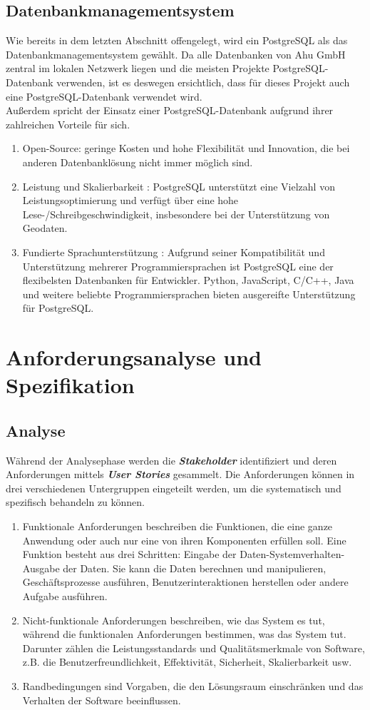 \documentclass[a4paper,12pt]{scrreprt}
\begin{document}
	\section{Datenbankmanagementsystem}
	Wie bereits in dem letzten Abschnitt offengelegt, wird ein PostgreSQL als das Datenbankmanagementsystem gewählt. 
	Da alle Datenbanken von Ahu GmbH zentral im lokalen Netzwerk liegen und die meisten Projekte PostgreSQL-Datenbank verwenden, ist es deswegen ersichtlich, dass für dieses Projekt auch eine PostgreSQL-Datenbank verwendet wird. \\
	Außerdem spricht der Einsatz einer PostgreSQL-Datenbank aufgrund ihrer zahlreichen Vorteile für sich.
	\begin{enumerate}
		\item Open-Source: geringe Kosten und hohe Flexibilität und Innovation, die bei anderen Datenbanklösung nicht immer möglich sind. 
		\item Leistung und Skalierbarkeit : PostgreSQL unterstützt eine Vielzahl von Leistungsoptimierung und verfügt über eine hohe Lese-/Schreibgeschwindigkeit, insbesondere bei der Unterstützung von Geodaten.
		\item Fundierte Sprachunterstützung : Aufgrund seiner Kompatibilität und Unterstützung mehrerer Programmiersprachen ist PostgreSQL eine der flexibelsten Datenbanken für Entwickler. Python, JavaScript, C/C++, Java und weitere beliebte Programmiersprachen bieten ausgereifte Unterstützung für PostgreSQL.
	\end{enumerate}
	
	\chapter{Anforderungsanalyse und Spezifikation }
	\section{Analyse}
	Während der Analysephase werden die \textbf{\textit{Stakeholder}} identifiziert und deren Anforderungen mittels \textbf{\textit{User Stories}} gesammelt. Die Anforderungen können in drei verschiedenen Untergruppen eingeteilt werden, um die systematisch und spezifisch behandeln zu können.
	\begin{enumerate}
		\item Funktionale Anforderungen beschreiben die Funktionen, die eine ganze Anwendung oder auch nur eine von ihren Komponenten erfüllen soll. Eine Funktion besteht aus drei Schritten: Eingabe der Daten-Systemverhalten-Ausgabe der Daten. Sie kann die Daten berechnen und manipulieren, Geschäftsprozesse ausführen, Benutzerinteraktionen herstellen oder andere Aufgabe ausführen.
		\item Nicht-funktionale Anforderungen beschreiben, wie das System es tut, während die funktionalen Anforderungen bestimmen, was das System tut. Darunter zählen die Leistungsstandards und Qualitätsmerkmale von Software, z.B. die Benutzerfreundlichkeit, Effektivität, Sicherheit, Skalierbarkeit usw.
		\item Randbedingungen sind Vorgaben, die den Lösungsraum einschränken und das Verhalten der Software beeinflussen.
	\end{enumerate}
\end{document}
